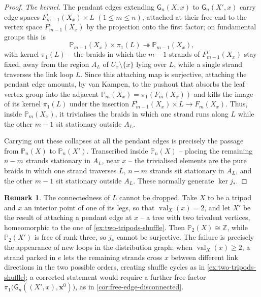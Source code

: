 \documentclass[reqno]{amsart}
\theoremstyle{definition}
\newtheorem{remark}[theorem]{Remark}
\newcommand\bfx{\mathbf{x}}
\newcommand\sfG{\mathsf{G}}
\newcommand{\PB}{\mathbb{P}}
\newcommand{\Z}{\mathbb{Z}}
\newcommand{\base}{\bfx^0}
\DeclareMathOperator{\val}{val}
\numberwithin{equation}{section}
\begin{document}
\begin{proof}
\emph{The kernel.} The pendant edges extending \(\sfG_n(X,x)\)
to \(\sfG_n(X',x)\) carry edge spaces \(F^i_{m-1}(X_x)\times L\)
\((1\le m\le n)\), attached at their free end to the vertex space
\(F^i_{m-1}(X_x)\) by the projection onto the first factor; on
fundamental groups this is
\[
\PB_{m-1}(X_x)\times\pi_1(L)\twoheadrightarrow\PB_{m-1}(X_x),
\]
with kernel \(\pi_1(L)\) -- the braids in which the \(m-1\) strands
of \(F^i_{m-1}(X_x)\) stay fixed, away from the region \(A_L\) of
\(U_x\setminus\{x\}\) lying over \(L\), while a single strand
traverses the link loop \(L\). Since this attaching map is
surjective, attaching the pendant edge amounts, by van Kampen, to
the pushout that absorbs the leaf vertex group into the adjacent
\(\PB_m(X_x)=\pi_1(F_m(X_x))\) and kills the image of its kernel
\(\pi_1(L)\) under the insertion
\(F^i_{m-1}(X_x)\times L\to F_m(X_x)\). Thus, inside
\(\PB_m(X_x)\), it trivialises the braids in which one strand runs
along \(L\) while the other \(m-1\) sit stationary outside
\(A_L\).

Carrying out these collapses at all the pendant edges is precisely
the passage from \(\PB_n(X)\) to \(\PB_n(X')\). Transcribed inside
\(\PB_n(X)\) -- placing the remaining \(n-m\) strands stationary in
\(A_L\), near \(x\) -- the trivialised elements are the pure braids
in which one strand traverses \(L\), \(n-m\) strands sit stationary
in \(A_L\), and the other \(m-1\) sit stationary outside \(A_L\).
These normally generate \(\ker j_\ast\).
\end{proof}

\begin{remark}\label{rem:pendant-valency}
The connectedness of \(L\) cannot be dropped. Take \(X\) to be a
tripod and \(x\) an interior point of one of its legs, so that
\(\val_X(x)=2\), and let \(X'\) be the result of attaching a
pendant edge at \(x\) -- a tree with two trivalent vertices,
homeomorphic to the one of \cref{ex:two-tripods-shuffle}. Then
\(\PB_2(X)\cong\Z\), while \(\PB_2(X')\) is free of rank three, so
\(j_\ast\) cannot be surjective. The failure is precisely the
appearance of new loops in the distribution graph: when
\(\val_X(x)\geq2\), a strand parked in \(e\) lets the remaining
strands cross \(x\) between different link directions in the two
possible orders, creating shuffle cycles as in
\cref{ex:two-tripods-shuffle}; a corrected statement would require
a further free factor \(\pi_1\bigl(\sfG_n((X',x),\base)\bigr)\),
as in \cref{cor:free-edge-disconnected}.
\end{remark}
\end{document}
